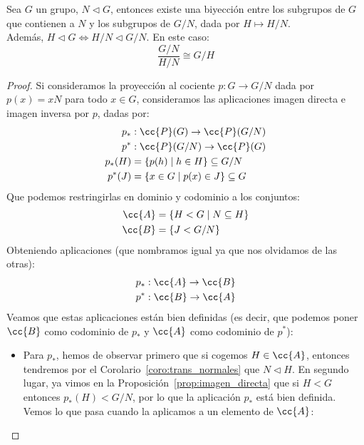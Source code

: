 \begin{teo}
    Sea $G$ un grupo, $N\lhd G$, entonces existe una biyección entre los subgrupos de $G$ que contienen a $N$ y los subgrupos de $G/N$, dada por $H\longmapsto H/N$.\\

    \noindent
    Además, $H\lhd G \Longleftrightarrow H/N\lhd G/N$.
    En este caso:
    \begin{equation*}
        \dfrac{G/N}{H/N} \cong G/H
    \end{equation*}
    \begin{proof}
        Si consideramos la proyección al cociente $p:G\to G/N$ dada por $p(x) = xN$ para todo $x\in G$, consideramos las aplicaciones imagen directa e imagen inversa por $p$, dadas por:
        \begin{align*}
            p_\ast&:\cc{P}(G) \to \cc{P}(G/N) \\
            p^\ast&:\cc{P}(G/N) \to \cc{P}(G) \\
            p_\ast(H) &= \{p(h) \mid h\in H\} \subseteq G/N \\
            p^\ast(J) &= \{x\in G \mid p(x) \in J\} \subseteq G
        \end{align*}
        Que podemos restringirlas en dominio y codominio a los conjuntos:
        \begin{align*}
            \cc{A} &= \{H< G \mid N\subseteq H\} \\
            \cc{B} &= \{J < G/N\}
        \end{align*}
        Obteniendo aplicaciones (que nombramos igual ya que nos olvidamos de las otras):
        \begin{align*}
            p_\ast&:\cc{A} \to \cc{B} \\
            p^\ast&:\cc{B} \to \cc{A}
        \end{align*}
        Veamos que estas aplicaciones están bien definidas (es decir, que podemos poner $\cc{B}$ como codominio de $p_\ast$ y $\cc{A}$ como codominio de $p^\ast$):
        \begin{itemize}
            \item Para $p_\ast$, hemos de observar primero que si cogemos $H\in \cc{A}$, entonces tendremos por el Corolario~\ref{coro:trans_normales} que $N\lhd H$. En segundo lugar, ya vimos en la Proposición~\ref{prop:imagen_directa} que si $H<G$ entonces $p_\ast(H) < G/N$, por lo que la aplicación $p_\ast$ está bien definida. Vemos lo que pasa cuando la aplicamos a un elemento de $\cc{A}$:

\end{itemize}
\end{proof}
\end{teo}
